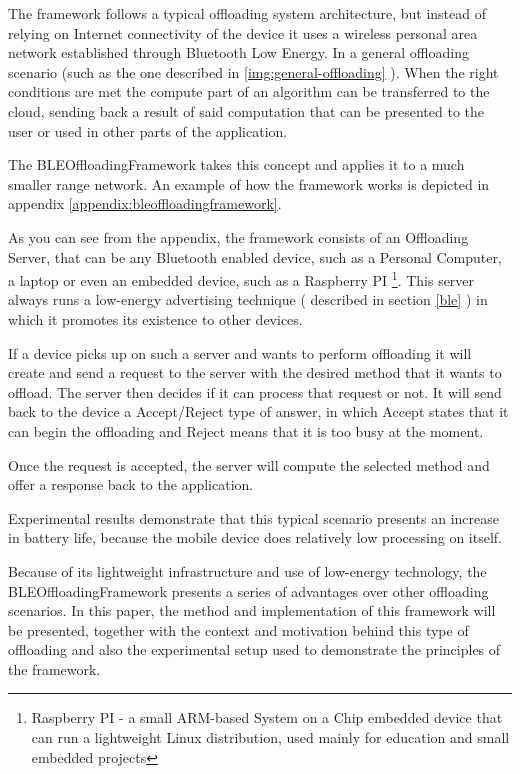 The framework follows a typical offloading system architecture, but instead of relying on Internet connectivity of the device it uses a wireless personal area network established through Bluetooth Low Energy. In a general offloading scenario (such as the one described in \ref{img:general-offloading} ). When the right conditions are met the compute part of an algorithm can be transferred to the cloud, sending back a result of said computation that can be presented to the user or used in other parts of the application.





The BLEOffloadingFramework takes this concept and applies it to a much smaller range network. An example of how the framework works is depicted in appendix \ref{appendix:bleoffloadingframework}.

As you can see from the appendix, the framework consists of an Offloading Server, that can be any Bluetooth enabled device, such as a Personal Computer, a laptop or even an embedded device, such as a Raspberry PI \footnote{Raspberry PI - a small ARM-based System on a Chip embedded device that can run a lightweight Linux distribution, used mainly for education and small embedded projects}. This server always runs a low-energy advertising technique ( described in section \ref{ble} ) in which it promotes its existence to other devices.

If a device picks up on such a server and wants to perform offloading it will create and send a request to the server with the desired method that it wants to offload. The server then decides if it can process that request or not. It will send back to the device a Accept/Reject type of answer, in which Accept states that it can begin the offloading and Reject means that it is too busy at the moment.

Once the request is accepted, the server will compute the selected method and offer a response back to the application. 

Experimental results demonstrate that this typical scenario presents an increase in battery life, because the mobile device does relatively low processing on itself.

Because of its lightweight infrastructure and use of low-energy technology, the BLEOffloadingFramework presents a series of advantages over other offloading scenarios. In this paper, the method and implementation of this framework will be presented, together with the context and motivation behind this type of offloading and also the experimental setup used to demonstrate the principles of the framework.


